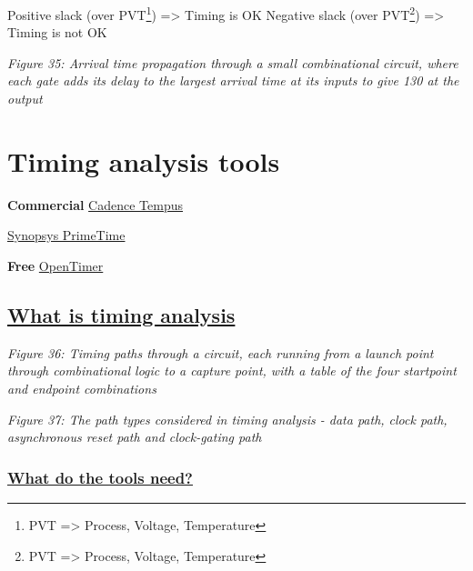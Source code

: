 Positive slack (over PVT\footnote{PVT =\textgreater{} Process, Voltage,
  Temperature}) =\textgreater{} Timing is OK Negative slack (over
PVT\footnote{PVT =\textgreater{} Process, Voltage, Temperature})
=\textgreater{} Timing is not OK


{
\centering
{}
}

\emph{Figure 35: Arrival time propagation through a small combinational
circuit, where each gate adds its delay to the largest arrival time at
its inputs to give 130 at the output}

\section{Timing analysis tools}\label{timing-analysis-tools}

\textbf{Commercial}
\href{https://www.cadence.com/en_US/home/tools/digital-design-and-signoff/silicon-signoff/tempus-timing-signoff-solution.html}{Cadence
Tempus}

\href{https://www.synopsys.com/implementation-and-signoff/signoff/primetime.html}{Synopsys
PrimeTime}

\textbf{Free} \href{https://github.com/OpenTimer/OpenTimer}{OpenTimer}

\subsection{\texorpdfstring{\href{https://www.synopsys.com/glossary/what-is-static-timing-analysis.html}{What
is timing
analysis}}{What is timing analysis}}\label{what-is-timing-analysis}


{
\centering
{}
}

\emph{Figure 36: Timing paths through a circuit, each running from a
launch point through combinational logic to a capture point, with a
table of the four startpoint and endpoint combinations}


{
\centering
{}
}

\emph{Figure 37: The path types considered in timing analysis - data
path, clock path, asynchronous reset path and clock-gating path}

\subsubsection{\texorpdfstring{\href{https://www.csee.umbc.edu/courses/graduate/CMPE641/Fall08/cpatel2/slides/lect05_LIB.pdf}{What
do the tools
need?}}{What do the tools need?}}\label{what-do-the-tools-need}

